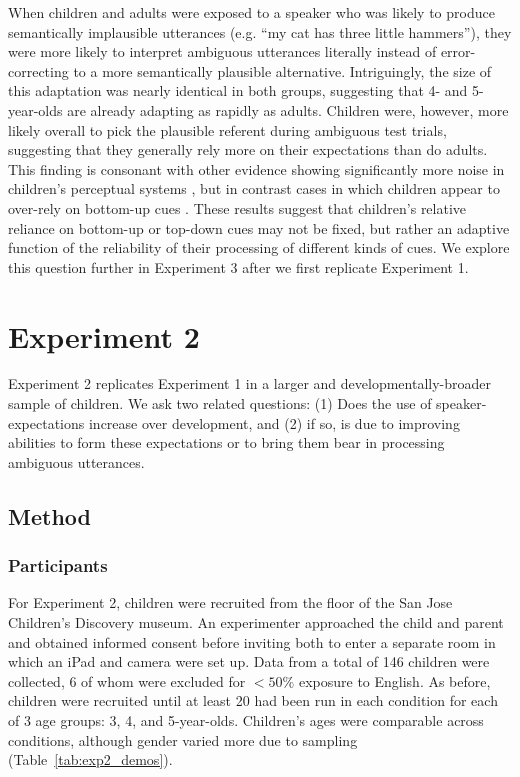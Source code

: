 \documentclass[man,floatsintext]{apa6}
\begin{document}
When children and adults were exposed to a speaker who was likely to produce semantically implausible utterances (e.g. ``my cat has three little hammers''), they were more likely to interpret ambiguous utterances literally instead of error-correcting to a more semantically plausible alternative. Intriguingly, the size of this adaptation was nearly identical in both groups, suggesting that 4- and 5-year-olds are already adapting as rapidly as adults. Children were, however, more likely overall to pick the plausible referent during ambiguous test trials, suggesting that they generally rely more on their expectations than do adults. This finding is consonant with other evidence showing significantly more noise in children's perceptual systems \cite{neuman1983}, but in contrast cases in which children appear to over-rely on bottom-up cues \cite{snedeker2004, trueswell1999}. These results suggest that children's relative reliance on bottom-up or top-down cues may not be fixed, but rather an adaptive function of the reliability of their processing of different kinds of cues. We explore this question further in Experiment 3 after we first replicate Experiment 1.

\section{Experiment 2}

Experiment 2 replicates Experiment 1 in a larger and developmentally-broader sample of children. We ask two related questions: (1) Does the use of speaker-expectations increase over development, and (2) if so, is due to improving abilities to form these expectations or to bring them bear in processing ambiguous utterances.

\subsection{Method}

\subsubsection{Participants}

For Experiment 2, children were recruited from the floor of the San Jose Children's Discovery museum. An experimenter approached the child and parent and obtained informed consent before inviting both to enter a separate room in which an iPad and camera were set up. Data from a total of 146 children were collected, 6 of whom were excluded for $<50\%$ exposure to English. As before, children were recruited until at least 20 had been run in each condition for each of 3 age groups: 3, 4, and 5-year-olds. Children's ages were comparable across conditions, although gender varied more due to sampling (Table~\ref{tab:exp2_demos}).
\end{document}
